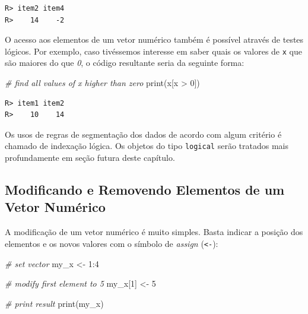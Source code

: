 \documentclass[
  11pt,
]{book}
\newenvironment{Shaded}{\begin{snugshade}}{\end{snugshade}}
\newcommand{\CommentTok}[1]{\textcolor[rgb]{0.37,0.37,0.37}{\textit{#1}}}
\newcommand{\DecValTok}[1]{\textcolor[rgb]{0.06,0.06,0.06}{#1}}
\newcommand{\FunctionTok}[1]{\textcolor[rgb]{0,0,0}{#1}}
\newcommand{\NormalTok}[1]{#1}
\newcommand{\OtherTok}[1]{\textcolor[rgb]{0.37,0.37,0.37}{#1}}
\newcommand{\SpecialCharTok}[1]{\textcolor[rgb]{0,0,0}{#1}}
\begin{document}
\begin{verbatim}
R> item2 item4 
R>    14    -2
\end{verbatim}

O acesso aos elementos de um vetor numérico também é possível através de testes lógicos. Por exemplo, caso tivéssemos interesse em saber quais os valores de \texttt{x} que são maiores do que \emph{0}, o código resultante seria da seguinte forma:

\begin{Shaded}
\begin{Highlighting}[]
\CommentTok{\# find all values of x higher than zero}
\FunctionTok{print}\NormalTok{(x[x }\SpecialCharTok{\textgreater{}} \DecValTok{0}\NormalTok{])}
\end{Highlighting}
\end{Shaded}

\begin{verbatim}
R> item1 item2 
R>    10    14
\end{verbatim}

Os usos de regras de segmentação dos dados de acordo com algum critério é chamado de indexação lógica. Os objetos do tipo \texttt{logical} serão tratados mais profundamente em seção futura deste capítulo.

\hypertarget{modificando-e-removendo-elementos-de-um-vetor-numuxe9rico}{%
\subsection{Modificando e Removendo Elementos de um Vetor Numérico}\label{modificando-e-removendo-elementos-de-um-vetor-numuxe9rico}}

A modificação de um vetor numérico é muito simples. Basta indicar a posição dos elementos e os novos valores com o símbolo de \emph{assign} (\texttt{\textless{}-}):

\begin{Shaded}
\begin{Highlighting}[]
\CommentTok{\# set vector}
\NormalTok{my\_x }\OtherTok{\textless{}{-}} \DecValTok{1}\SpecialCharTok{:}\DecValTok{4}

\CommentTok{\# modify first element to 5}
\NormalTok{my\_x[}\DecValTok{1}\NormalTok{] }\OtherTok{\textless{}{-}} \DecValTok{5}

\CommentTok{\# print result}
\FunctionTok{print}\NormalTok{(my\_x)}
\end{Highlighting}
\end{Shaded}
\end{document}
